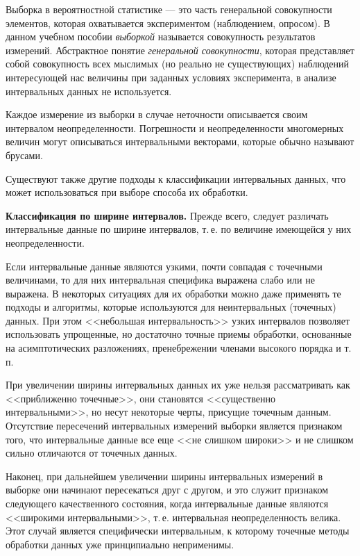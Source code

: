 \documentclass[a5paper,openany]{book}
\begin{document}
{Выборка в вероятностной статистике --- это часть генеральной совокупности элементов, которая охватывается экспериментом (наблюдением, опросом). 
В данном учебном пособии \textit{выборкой}  называется
совокупность результатов измерений. Абстрактное понятие \emph{генеральной совокупности}, 
которая представляет собой совокупность всех мыслимых (но реально не существующих) 
наблюдений интересующей нас величины при заданных условиях эксперимента, в анализе 
интервальных данных не используется.  

Каждое измерение из выборки в случае неточности описывается своим интервалом 
неопределенности. Погрешности и неопределенности многомерных величин могут описываться 
интервальными векторами, которые обычно называют брусами. 

Существуют также другие подходы к классификации интервальных данных, что может использоваться при выборе способа их обработки. 

{\bf Классификация по ширине интервалов.}  \label{InteWidClass}
Прежде всего, следует различать интервальные данные по ширине интервалов, 
т.\,е. по величине имеющейся у них неопределенности. 

Если интервальные данные являются узкими, почти совпадая 
с точечными величинами, то для них интервальная специфика выражена слабо или не выражена. В некоторых ситуациях для их обработки можно даже применять те подходы 
и алгоритмы, которые используются для неинтервальных (точечных) данных. При этом 
<<небольшая интервальность>> узких интервалов позволяет использовать упрощенные, но 
достаточно точные приемы обработки, основанные на асимптотических разложениях, пренебрежении 
членами высокого порядка и т.\,п. 

При увеличении ширины интервальных данных их  уже нельзя рассматривать как 
<<приближенно точечные>>, они становятся <<существенно интервальными>>,  
но несут некоторые черты, присущие точечным данным. Отсутствие пересечений интервальных измерений выборки является признаком того, что интервальные данные все еще <<не слишком широки>> и не слишком сильно отличаются от точечных данных. 

Наконец, при дальнейшем увеличении ширины интервальных измерений в выборке они начинают 
пересекаться друг с другом, и это служит признаком следующего качественного состояния,
когда интервальные данные являются <<широкими интервальными>>, т.\,е. интервальная 
неопределенность велика. Этот случай является специфически интервальным, к которому 
точечные методы обработки данных уже принципиально неприменимы. 

}
\end{document}
